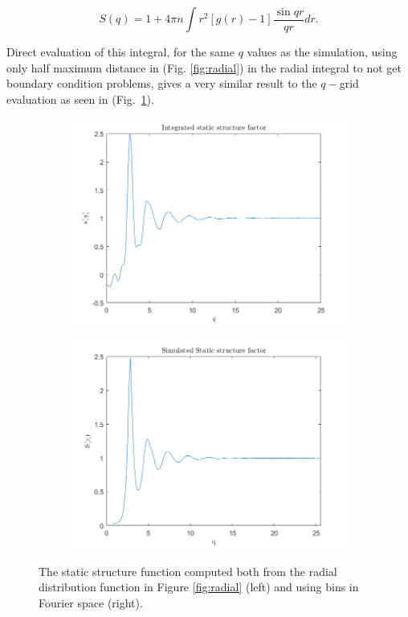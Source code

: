 \begin{equation}
S(q)= 1+ 4\pi n \int r^2\left[g(r)-1\right]\frac{\sin{qr}}{qr}dr.
\end{equation}

Direct evaluation of this integral, for the same $q$ values as the simulation, using only half maximum distance in (Fig. \ref{fig:radial}) in the radial integral to not get boundary condition problems, gives a very similar result to the $q-$grid evaluation as seen in (Fig.~\ref{fig:StaticStructure}).

\begin{figure}[H]
    \centering
    \captionsetup[subfigure]{justification=centering}
    \begin{subfigure}[b]{0.40\textwidth}
        \centering
        \includegraphics[width=\textwidth]{graphics/task8/integral.png}
    \end{subfigure}
    \begin{subfigure}[b]{0.40\textwidth}
        \centering
        \includegraphics[width=\textwidth]{graphics/task8/simulated.png}
    \end{subfigure}
    \caption{The static structure function computed both from the radial distribution function in Figure \ref{fig:radial} (left) and using bins in Fourier space (right).}
    \label{fig:StaticStructure}
\end{figure}



